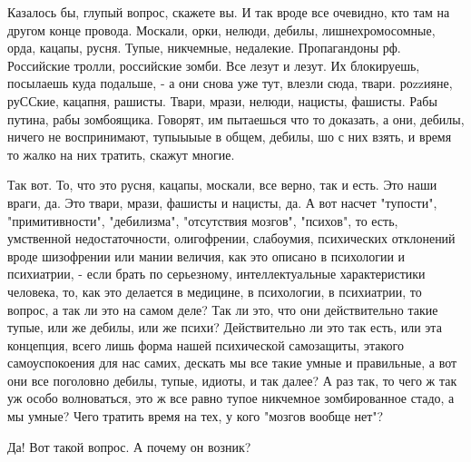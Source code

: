 Казалось бы, глупый вопрос, скажете вы. И так вроде все очевидно, кто там на
другом конце провода.  Москали, орки, нелюди, дебилы, лишнехромосомные, орда,
кацапы, русня. Тупые, никчемные, недалекие. Пропагандоны рф. Российские тролли,
российские зомби.  Все лезут и лезут. Их блокируешь, посылаешь куда подальше, -
а они снова уже тут, влезли сюда, твари. роzzияне, руССкие, кацапня, рашисты.
Твари, мрази, нелюди, нацисты, фашисты.  Рабы путина, рабы зомбоящика. Говорят,
им пытаешься что то доказать, а они, дебилы, ничего не воспринимают, тупыыыые в
общем, дебилы, шо с них взять, и время то жалко на них тратить, скажут многие.

Так вот. То, что это русня, кацапы, москали, все верно, так и есть. Это наши
враги, да. Это твари, мрази, фашисты и нацисты, да. А вот насчет "тупости",
"примитивности", "дебилизма", "отсутствия мозгов", "психов", то есть,
умственной недостаточности, олигофрении, слабоумия, психических отклонений
вроде шизофрении или мании величия, как это описано в психологии и психиатрии,
- если брать по серьезному, интеллектуальные характеристики человека, то, как
это делается в медицине, в психологии, в психиатрии, то вопрос, а так ли это на
самом деле? Так ли это, что они действительно такие тупые, или же дебилы, или
же психи?  Действительно ли это так есть, или эта концепция, всего лишь форма
нашей психической самозащиты, этакого самоуспокоения для нас самих, дескать мы
все такие умные и правильные, а вот они все поголовно дебилы, тупые, идиоты, и
так далее? А раз так, то чего ж так уж особо волноваться, это ж все равно тупое
никчемное зомбированное стадо, а мы умные? Чего тратить время на тех, у кого
"мозгов вообще нет"?

Да! Вот такой вопрос. А почему он возник?

